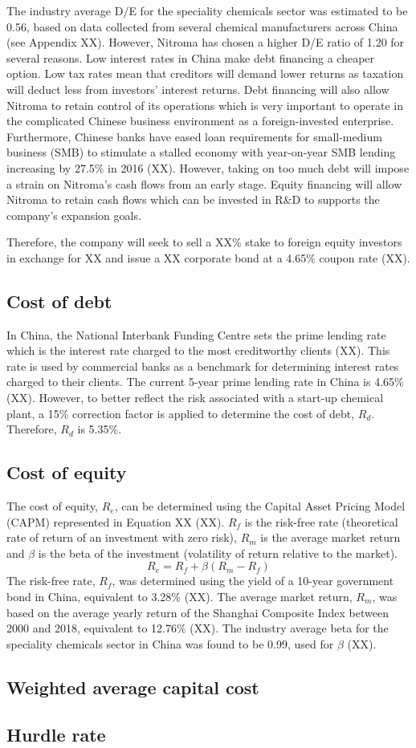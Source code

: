 The industry average D/E for the speciality chemicals sector was estimated to be 0.56, based on data collected from several chemical manufacturers across China (see Appendix XX). However, Nitroma has chosen a higher D/E ratio of 1.20 for several reasons. Low interest rates in China make debt financing a cheaper option. Low tax rates mean that creditors will demand lower returns as taxation will deduct less from investors’ interest returns. Debt financing will also allow Nitroma to retain control of its operations which is very important to operate in the complicated Chinese business environment as a foreign-invested enterprise. Furthermore, Chinese banks have eased loan requirements for small-medium business (SMB) to stimulate a stalled economy with year-on-year SMB lending increasing by 27.5\% in 2016 (XX). However, taking on too much debt will impose a strain on Nitroma’s cash flows from an early stage. Equity financing will allow Nitroma to retain cash flows which can be invested in R&D to supports the company’s expansion goals.

Therefore, the company will seek to sell a XX\% stake to foreign equity investors in exchange for XX and issue a XX corporate bond at a 4.65\% coupon rate (XX).

\subsection{Cost of debt}
In China, the National Interbank Funding Centre sets the prime lending rate which is the interest rate charged to the most creditworthy clients (XX). This rate is used by commercial banks as a benchmark for determining interest rates charged to their clients. The current 5-year prime lending rate in China is 4.65\% (XX). However, to better reflect the risk associated with a start-up chemical plant, a 15\% correction factor is applied to determine the cost of debt, $R_{d}$. Therefore, $R_{d}$ is 5.35\%.

\subsection{Cost of equity}
The cost of equity, $R_{e}$, can be determined using the Capital Asset Pricing Model (CAPM) represented in Equation XX (XX). $R_{f}$ is the risk-free rate (theoretical rate of return of an investment with zero risk), $R_{m}$ is the average market return and $\beta$ is the beta of the investment (volatility of return relative to the market).
\begin{equation}
\label{eqn:capm}
    R_{e}=R_{f}+\beta(R_{m}-R_{f})
\end{equation}
The risk-free rate, $R_{f}$, was determined using the yield of a 10-year government bond in China, equivalent to 3.28\% (XX). The average market return, $R_{m}$, was based on the average yearly return of the Shanghai Composite Index between 2000 and 2018, equivalent to 12.76\% (XX). The industry average beta for the speciality chemicals sector in China was found to be 0.99, used for $\beta$ (XX).

\subsection{Weighted average capital cost}
\subsection{Hurdle rate}